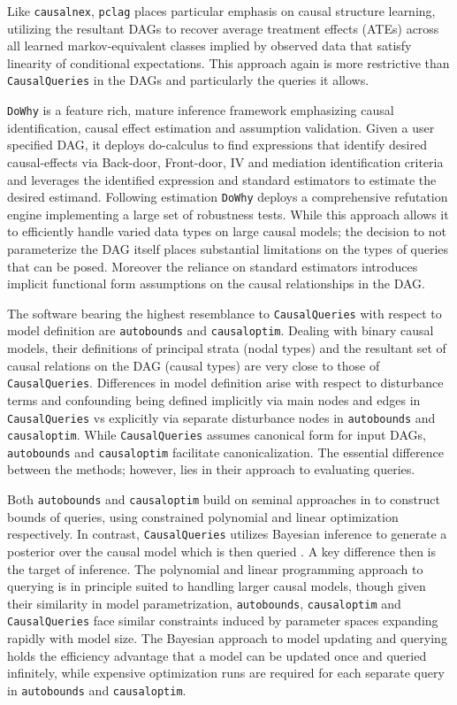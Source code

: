 \documentclass[
  11pt,
  article]{jss}
\begin{document}
Like \texttt{causalnex}, \texttt{pclag} places particular emphasis on
causal structure learning, utilizing the resultant DAGs to recover
average treatment effects (ATEs) across all learned markov-equivalent
classes implied by observed data that satisfy linearity of conditional
expectations. This approach again is more restrictive than
\texttt{CausalQueries} in the DAGs and particularly the queries it
allows.

\texttt{DoWhy} is a feature rich, mature inference framework emphasizing
causal identification, causal effect estimation and assumption
validation. Given a user specified DAG, it deploys do-calculus to find
expressions that identify desired causal-effects via Back-door,
Front-door, IV and mediation identification criteria and leverages the
identified expression and standard estimators to estimate the desired
estimand. Following estimation \texttt{DoWhy} deploys a comprehensive
refutation engine implementing a large set of robustness tests. While
this approach allows it to efficiently handle varied data types on large
causal models; the decision to not parameterize the DAG itself places
substantial limitations on the types of queries that can be posed.
Moreover the reliance on standard estimators introduces implicit
functional form assumptions on the causal relationships in the DAG.

The software bearing the highest resemblance to \texttt{CausalQueries}
with respect to model definition are \texttt{autobounds} and
\texttt{causaloptim}. Dealing with binary causal models, their
definitions of principal strata (nodal types) and the resultant set of
causal relations on the DAG (causal types) are very close to those of
\texttt{CausalQueries}. Differences in model definition arise with
respect to disturbance terms and confounding being defined implicitly
via main nodes and edges in \texttt{CausalQueries} vs explicitly via
separate disturbance nodes in \texttt{autobounds} and
\texttt{causaloptim}. While \texttt{CausalQueries} assumes canonical
form for input DAGs, \texttt{autobounds} and \texttt{causaloptim}
facilitate canonicalization. The essential difference between the
methods; however, lies in their approach to evaluating queries.

Both \texttt{autobounds} and \texttt{causaloptim} build on seminal
approaches in \citet{balke_bounds_1997} to construct bounds of queries,
using constrained polynomial and linear optimization respectively. In
contrast, \texttt{CausalQueries} utilizes Bayesian inference to generate
a posterior over the causal model which is then queried
\citep[consistent
with][]{chickering_clinicians_1996, zhang_partial_2022}. A key
difference then is the target of inference. The polynomial and linear
programming approach to querying is in principle suited to handling
larger causal models, though given their similarity in model
parametrization, \texttt{autobounds}, \texttt{causaloptim} and
\texttt{CausalQueries} face similar constraints induced by parameter
spaces expanding rapidly with model size. The Bayesian approach to model
updating and querying holds the efficiency advantage that a model can be
updated once and queried infinitely, while expensive optimization runs
are required for each separate query in \texttt{autobounds} and
\texttt{causaloptim}.
\end{document}
